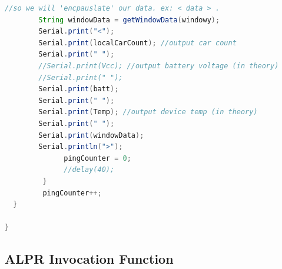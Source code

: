 \documentclass[11pt, oneside, fullpage, doublespace]{article}
\begin{document}
\begin{spacing}{1}
\begin{lstlisting}[language=java]
        //so we will 'encpauslate' our data. ex: < data > .
        String windowData = getWindowData(windowy);
        Serial.print("<");
        Serial.print(localCarCount); //output car count
        Serial.print(" ");
        //Serial.print(Vcc); //output battery voltage (in theory)
        //Serial.print(" ");
        Serial.print(batt);
        Serial.print(" ");
        Serial.print(Temp); //output device temp (in theory)
        Serial.print(" ");
        Serial.print(windowData);
        Serial.println(">");
              pingCounter = 0;
              //delay(40);
         }
         pingCounter++;  
  }

}
\end{lstlisting}
\end{spacing}

\subsection*{ALPR Invocation Function}
\end{document}
